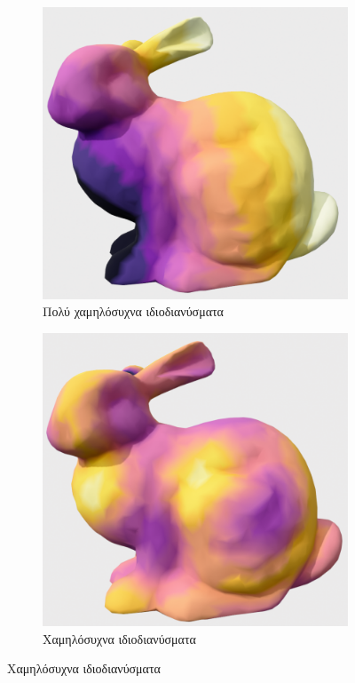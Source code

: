 \documentclass[draft]{article}
\begin{document}
\begin{figure}[h]
	\begin{subfigure}{0.5\textwidth}
		\includegraphics[width=0.9\linewidth]{"vl_freq.png"}
		\caption{Πολύ χαμηλόσυχνα ιδιοδιανύσματα}
		\label{fig:vis1}
	\end{subfigure}
	\begin{subfigure}{0.5\textwidth}
		\includegraphics[width=0.9\linewidth]{"l_freq.png"}
		\caption{Χαμηλόσυχνα ιδιοδιανύσματα}
		\label{fig:vis2}

\end{subfigure}
\end{figure}
\end{document}
